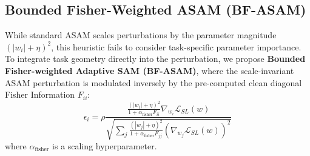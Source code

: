 \documentclass{article}
\theoremstyle{plain}
\theoremstyle{definition}
\theoremstyle{remark}
\begin{document}
\subsection{Bounded Fisher-Weighted ASAM (BF-ASAM)}
While standard ASAM scales perturbations by the parameter magnitude $(|w_i| + \eta)^2$, this heuristic fails to consider task-specific parameter importance. To integrate task geometry directly into the perturbation, we propose \textbf{Bounded Fisher-weighted Adaptive SAM (BF-ASAM)}, where the scale-invariant ASAM perturbation is modulated inversely by the pre-computed clean diagonal Fisher Information $F_{ii}$:
\begin{equation}
    \epsilon_i = \rho \frac{ \frac{(|w_i| + \eta)^2}{1 + \alpha_{\text{fisher}} F_{ii}} \nabla_{w_i} \mathcal{L}_{SL}(w) }{ \sqrt{\sum_j \frac{(|w_j| + \eta)^2}{1 + \alpha_{\text{fisher}} F_{jj}} (\nabla_{w_j} \mathcal{L}_{SL}(w))^2 } }
\end{equation}
where $\alpha_{\text{fisher}}$ is a scaling hyperparameter.
\end{document}

